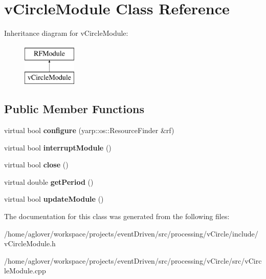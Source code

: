 \hypertarget{classvCircleModule}{\section{v\-Circle\-Module Class Reference}
\label{classvCircleModule}
}
Inheritance diagram for v\-Circle\-Module\-:\begin{figure}[H]
\begin{center}
\leavevmode
\includegraphics[height=2.000000cm]{classvCircleModule}
\end{center}
\end{figure}
\subsection*{Public Member Functions}
\begin{DoxyCompactItemize}
\item 
\hypertarget{classvCircleModule_a4b1534c8acd2a20a874b1e3fb2f2bbbf}{virtual bool {\bfseries configure} (yarp\-::os\-::\-Resource\-Finder \&rf)}\label{classvCircleModule_a4b1534c8acd2a20a874b1e3fb2f2bbbf}

\item 
\hypertarget{classvCircleModule_a48b6db38d3e64e47df8dc276844d7bd2}{virtual bool {\bfseries interrupt\-Module} ()}\label{classvCircleModule_a48b6db38d3e64e47df8dc276844d7bd2}

\item 
\hypertarget{classvCircleModule_a7d2220bd00b1e7081ec104a4c208f8d7}{virtual bool {\bfseries close} ()}\label{classvCircleModule_a7d2220bd00b1e7081ec104a4c208f8d7}

\item 
\hypertarget{classvCircleModule_abf28f9b5e2f01acf56bf825f1fcc2e01}{virtual double {\bfseries get\-Period} ()}\label{classvCircleModule_abf28f9b5e2f01acf56bf825f1fcc2e01}

\item 
\hypertarget{classvCircleModule_a176830c8a500b828c3f50d87b5e2d671}{virtual bool {\bfseries update\-Module} ()}\label{classvCircleModule_a176830c8a500b828c3f50d87b5e2d671}

\end{DoxyCompactItemize}


The documentation for this class was generated from the following files\-:\begin{DoxyCompactItemize}
\item 
/home/aglover/workspace/projects/event\-Driven/src/processing/v\-Circle/include/v\-Circle\-Module.\-h\item 
/home/aglover/workspace/projects/event\-Driven/src/processing/v\-Circle/src/v\-Circle\-Module.\-cpp\end{DoxyCompactItemize}
